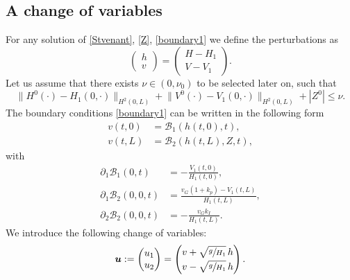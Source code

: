 \subsection{A change of variables}
For any solution of \eqref{Stvenant}, \eqref{Z}, \eqref{boundary1}
we define the perturbations as
\begin{equation}
\begin{pmatrix}
h\\v
\end{pmatrix}=
\begin{pmatrix}
H-H_{1}\\
V-V_{1}
\end{pmatrix}.
\label{change1}
\end{equation}
Let us assume that there exists $\nu\in(0,\nu_{0})$ to be selected later on, such that
\begin{equation*}
\lVert H^{0}(\cdot)-H_{1}(0,\cdot)\rVert_{H^{2}(0,L)}+\lVert V^{0}(\cdot)-V_{1}(0,\cdot)\rVert_{H^{2}(0,L)}+|Z^{0}|\leq \nu.
\end{equation*}
The boundary conditions \eqref{boundary1} can be written in the following form
\begin{equation}
\begin{split}
v(t,0)&=\mathcal{B}_{1}(h(t,0),t),\\
v(t,L)&=\mathcal{B}_{2}(h(t,L),Z,t),
\end{split}
\label{bound1}
\end{equation}
with
\begin{equation}
\begin{split}
\partial_{1}\mathcal{B}_{1}(0,t)&=-\frac{V_{1}(t,0)}{H_{1}(t,0)},\\
\partial_{1}\mathcal{B}_{2}(0,0,t)&=\frac{v_{G}(1+k_{p})-V_{1}(t,L)}{H_{1}(t,L)},\\
\partial_{2}\mathcal{B}_{2}(0,0,t)&=-\frac{v_{G}k_{I}}{H_{1}(t,L)}.
\end{split}
\label{k1k30}
\end{equation}
We introduce the following change of variables:
\begin{equation}
\boldsymbol{u}: =\begin{pmatrix}
u_{1}\\u_{2}
\end{pmatrix}=
\begin{pmatrix}
v+\sqrt{\sfrac{g}{H_{1}}}\,h\\[2pt]
v-\sqrt{\sfrac{g}{H_{1}}}\,h
\end{pmatrix}.
\label{change2}
\end{equation}
